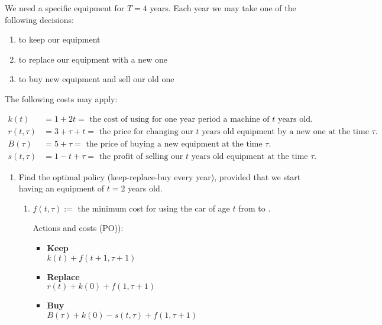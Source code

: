 \pagebreak
\begin{prob} %
    We need a specific equipment for $T = 4$ years. Each year we may take one of the following decisions:
    \begin{enumerate}[label = {(\roman*)}]
        \item to keep our equipment
        \item to replace our equipment with a new one
        \item to buy new equipment and sell our old one
    \end{enumerate}


The following costs may apply:

$\begin{aligned}
    k(t) 
    &= 1 + 2t 
    = \text{ the cost of using for one year period a machine of $t$ years old.} \\
    r(t, \tau ) 
    &= 3 + \tau + t 
    = \text{ the price for changing our $t$ years old equipment by a new one at the time $\tau$.} \\
    B(\tau ) 
    &= 5 + \tau 
    = \text{ the price of buying a new equipment at the time $\tau$.} \\
    s(t, \tau ) 
    &= 1 - t + \tau 
    = \text{ the profit of selling our $t$ years old equipment at the time $\tau$.}
\end{aligned}$


\begin{enumerate}[label = {\textbf{(\greek*)}}]
    \item Find the optimal policy (keep-replace-buy every year), provided that we start having an equipment of $t = 2$ years old.
    
    \begin{sol}
    
    \begin{enumerate}[start = 1, label = {\protect\tsc{$\mathbf{S_{\arabic*}}$}}]
    \item 
{}

$f(t,\tau):=$ the minimum cost for using the car of age $t$ from \tc{$\tau$} to .

Actions and costs (PO)):
\begin{itemize}
    \item \textbf{Keep}    \\ $k(t)+f(t+ 1,\tau+ 1)$
    \item \textbf{Replace} \\ $r(t)+k(0)+f(1,\tau+1)$
    \item \textbf{Buy} \\ $B(\tau)+k(0)-s(t,\tau)+f(1,\tau+1)$
\end{itemize}


\end{enumerate}
\end{sol}
\end{enumerate}
\end{prob}
